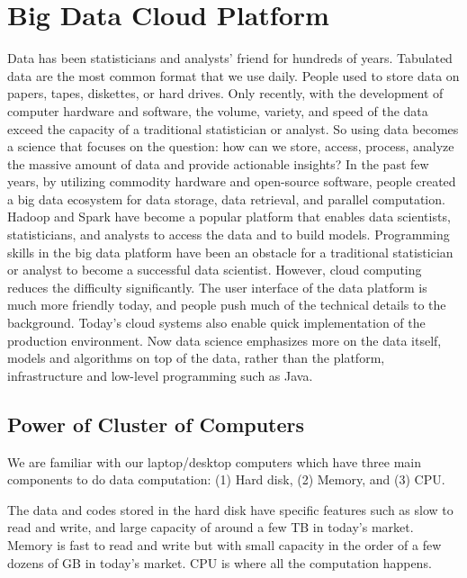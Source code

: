 \documentclass[
  12pt,
]{krantz}
\begin{document}
\hypertarget{bigdatacloudplatform}{%
\chapter{Big Data Cloud Platform}\label{bigdatacloudplatform}}

Data has been statisticians and analysts' friend for hundreds of years. Tabulated data are the most common format that we use daily. People used to store data on papers, tapes, diskettes, or hard drives. Only recently, with the development of computer hardware and software, the volume, variety, and speed of the data exceed the capacity of a traditional statistician or analyst. So using data becomes a science that focuses on the question: how can we store, access, process, analyze the massive amount of data and provide actionable insights? In the past few years, by utilizing commodity hardware and open-source software, people created a big data ecosystem for data storage, data retrieval, and parallel computation. Hadoop and Spark have become a popular platform that enables data scientists, statisticians, and analysts to access the data and to build models. Programming skills in the big data platform have been an obstacle for a traditional statistician or analyst to become a successful data scientist. However, cloud computing reduces the difficulty significantly. The user interface of the data platform is much more friendly today, and people push much of the technical details to the background. Today's cloud systems also enable quick implementation of the production environment. Now data science emphasizes more on the data itself, models and algorithms on top of the data, rather than the platform, infrastructure and low-level programming such as Java.

\hypertarget{power-of-cluster-of-computers}{%
\section{Power of Cluster of Computers}\label{power-of-cluster-of-computers}}

We are familiar with our laptop/desktop computers which have three main components to do data computation: (1) Hard disk, (2) Memory, and (3) CPU.

The data and codes stored in the hard disk have specific features such as slow to read and write, and large capacity of around a few TB in today's market. Memory is fast to read and write but with small capacity in the order of a few dozens of GB in today's market. CPU is where all the computation happens.
\end{document}
